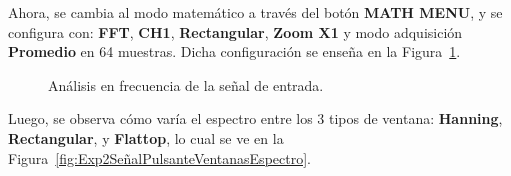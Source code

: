     Ahora, se cambia al modo matemático a través del botón \textbf{MATH MENU}, y se configura con: \textbf{FFT}, 
    \textbf{CH1}, \textbf{Rectangular}, \textbf{Zoom X1} y modo adquisición \textbf{Promedio} en 64 muestras. 
    Dicha configuración se enseña en la Figura~\ref{fig:Exp2SeñalPulsanteEspectro}.

      \begin{figure}[H]
        \centering
          \caption{Análisis en frecuencia de la señal de entrada.}
          \label{fig:Exp2SeñalPulsanteEspectro}
      \end{figure}

      Luego, se observa cómo varía el espectro entre los 3 tipos de ventana: \textbf{Hanning}, \textbf{Rectangular}, 
      y \textbf{Flattop}, lo cual se ve en la Figura~\ref{fig:Exp2SeñalPulsanteVentanasEspectro}.

